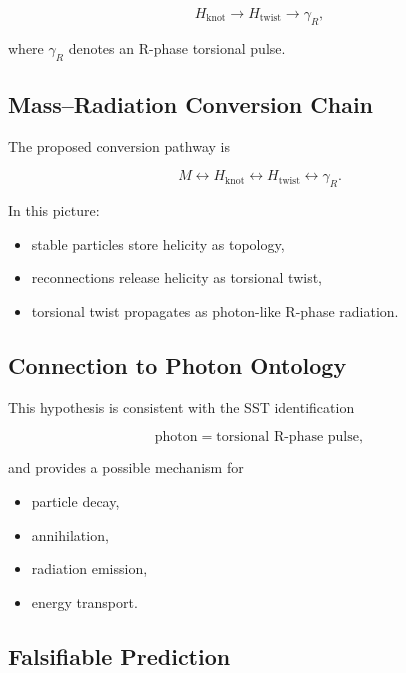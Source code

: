         \[
            H_{\mathrm{knot}}
            \rightarrow
            H_{\mathrm{twist}}
            \rightarrow
            \gamma_R ,
        \]
        
        where $\gamma_R$ denotes an R-phase torsional pulse.
    
    \subsection{Mass--Radiation Conversion Chain}
        
        The proposed conversion pathway is
        
        \[
            M
            \leftrightarrow
            H_{\mathrm{knot}}
            \leftrightarrow
            H_{\mathrm{twist}}
            \leftrightarrow
            \gamma_R.
        \]
        
        In this picture:
        
        \begin{itemize}
            \item stable particles store helicity as topology,
            \item reconnections release helicity as torsional twist,
            \item torsional twist propagates as photon-like R-phase radiation.
        \end{itemize}
    
    \subsection{Connection to Photon Ontology}
        
        This hypothesis is consistent with the SST identification
        
        \[
            \text{photon}
            =
            \text{torsional R-phase pulse},
        \]
        
        and provides a possible mechanism for
        
        \begin{itemize}
            \item particle decay,
            \item annihilation,
            \item radiation emission,
            \item energy transport.
        \end{itemize}
    
    \subsection{Falsifiable Prediction}
        
